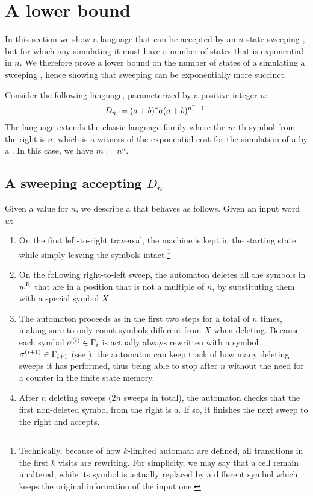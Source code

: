 \section{A lower bound}
In this section we show a language that can be accepted by an $n$-state sweeping \kDLA, but for which any \ONFA simulating it must have a number of states that is exponential in $n$.
We therefore prove a lower bound on the number of states of a \ONFA simulating a sweeping \kDLA, hence showing that sweeping \kDLAs can be exponentially more succinct.

Consider the following language, parameterized by a positive integer $n$:
\begin{equation*}
	D_n := (a+b)\star a (a+b)^{n^n-1} \text.
\end{equation*}
The language extends the classic language family where the $m$-th symbol from the right is $a$, which is a witness of the exponential cost for the simulation of a \TDFA by a \ODFA.
In this case, we have $m:=n^n$.


\subsection{A sweeping \kDLA accepting \texorpdfstring{$D_n$}{Ln}}
Given a value for $n$, we describe a  that behaves as follows. Given an input word $w$:
\begin{enumerate}
	\item On the first left-to-right traversal, the machine is kept in the starting state while simply leaving the symbols intact.\footnote{%
		      Technically, because of how $k$-limited automata are defined, all transitions in the first $k$ visits are rewriting. For simplicity, we may say that a cell remain unaltered, while its symbol is actually replaced by a different symbol which keeps the original information of the input one.}
	\item On the following right-to-left sweep, the automaton deletes all the symbols in $w\rev$ that are in a position that is not a multiple of $n$, by substituting them with a special symbol $X$.
	\item The automaton proceeds as in the first two steps for a total of $n$ times, making sure to only count symbols different from $X$ when deleting.
	      Because each symbol $\sigma\nth i\in\Gamma_i$ is actually always rewritten with a symbol $\sigma\nth{i+1}\in\Gamma_{i+1}$ (see ), the automaton can keep track of how many deleting sweeps it has performed, thus being able to stop after $n$ without the need for a counter in the finite state memory.
	\item After $n$ deleting sweeps ($2n$ sweeps in total), the automaton checks that the first non-deleted symbol from the right is $a$.
	      If so, it finishes the next sweep to the right and accepts.
\end{enumerate}

